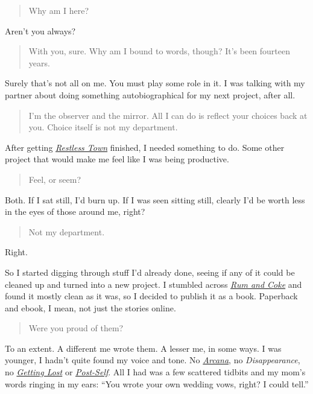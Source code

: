 \begin{quote}
Why am I here?
\end{quote}

Aren't you always?

\begin{quote}
With you, sure. Why am I bound to words, though? It's been fourteen years.
\end{quote}

Surely that's not all on me. You must play some role in it. I was talking with my partner about doing something autobiographical for my next project, after all.

\begin{quote}
I'm the observer and the mirror. All I can do is reflect your choices back at you. Choice itself is not my department.
\end{quote}

After getting \href{https://makyo.ink/publications/restless-town/}{\emph{Restless Town}} finished, I needed something to do. Some other project that would make me feel like I was being productive.

\begin{quote}
Feel, or seem?
\end{quote}

Both. If I sat still, I'd burn up. If I was seen sitting still, clearly I'd be worth less in the eyes of those around me, right?

\begin{quote}
Not my department.
\end{quote}

Right.

So I started digging through stuff I'd already done, seeing if any of it could be cleaned up and turned into a new project. I stumbled across \href{https://makyo.ink/publications/rum-and-coke/}{\emph{Rum and Coke}} and found it mostly clean as it was, so I decided to publish it as a book. Paperback and ebook, I mean, not just the stories online.

\begin{quote}
Were you proud of them?
\end{quote}

To an extent. A different me wrote them. A lesser me, in some ways. I was younger, I hadn't quite found my voice and tone. No \href{https://makyo.ink/publications/arcana}{\emph{Arcana}}, no \emph{Disappearance}, no \href{https://writing.drab-makyo.com/fiction/getting-lost/}{\emph{Getting Lost}} or \href{http://post-self.io}{\emph{Post-Self}}. All I had was a few scattered tidbits and my mom's words ringing in my ears: ``You wrote your own wedding vows, right? I could tell.''

